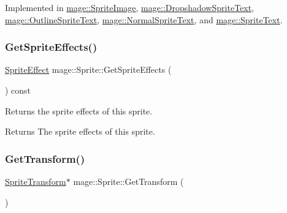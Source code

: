 Implemented in \hyperlink{classmage_1_1_sprite_image_ae30d3293931f674fea17008063755bb6}{mage\+::\+Sprite\+Image}, \hyperlink{classmage_1_1_dropshadow_sprite_text_af76422c9812d7dc38e9b98e587103c67}{mage\+::\+Dropshadow\+Sprite\+Text}, \hyperlink{classmage_1_1_outline_sprite_text_a524e9ad1caeeeaa32405e61d1a5e1032}{mage\+::\+Outline\+Sprite\+Text}, \hyperlink{classmage_1_1_normal_sprite_text_ad2a1b02bea18afd6bf61b106a727a355}{mage\+::\+Normal\+Sprite\+Text}, and \hyperlink{classmage_1_1_sprite_text_a45d5ac8410d5a46b26e8491946a2ad9e}{mage\+::\+Sprite\+Text}.

\hypertarget{classmage_1_1_sprite_a1a969b7cf3f1892894710a80582b4cd2}{}\label{classmage_1_1_sprite_a1a969b7cf3f1892894710a80582b4cd2} 
\subsubsection{\texorpdfstring{Get\+Sprite\+Effects()}{GetSpriteEffects()}}
{\footnotesize\ttfamily \hyperlink{namespacemage_a9cfe18123066ba4236f548f9de75d881}{Sprite\+Effect} mage\+::\+Sprite\+::\+Get\+Sprite\+Effects (\begin{DoxyParamCaption}{ }\end{DoxyParamCaption}) const\hspace{0.3cm}{\ttfamily [noexcept]}}

Returns the sprite effects of this sprite.

\begin{DoxyReturn}{Returns}
The sprite effects of this sprite. 
\end{DoxyReturn}
\hypertarget{classmage_1_1_sprite_aa28e031e38c51619b3bd7853d212ae06}{}\label{classmage_1_1_sprite_aa28e031e38c51619b3bd7853d212ae06} 
\subsubsection{\texorpdfstring{Get\+Transform()}{GetTransform()}\hspace{0.1cm}{\footnotesize\ttfamily [1/2]}}
{\footnotesize\ttfamily \hyperlink{structmage_1_1_sprite_transform}{Sprite\+Transform}$\ast$ mage\+::\+Sprite\+::\+Get\+Transform (\begin{DoxyParamCaption}{ }\end{DoxyParamCaption})\hspace{0.3cm}{\ttfamily [noexcept]}}

